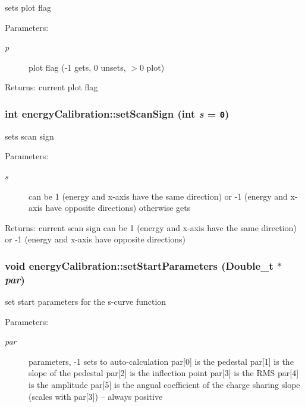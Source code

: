 sets plot flag \begin{Desc}
\item[Parameters:]
\begin{description}
\item[{\em p}]plot flag (-1 gets, 0 unsets, $>$0 plot) \end{description}
\end{Desc}
\begin{Desc}
\item[Returns:]current plot flag \end{Desc}
\subsubsection{\setlength{\rightskip}{0pt plus 5cm}int energy\-Calibration::set\-Scan\-Sign (int {\em s} = {\tt 0})\hspace{0.3cm}{\tt  [inline]}}\label{classenergyCalibration_7dbf1676b30ffe90c5aa917f1b2b77ee}


sets scan sign \begin{Desc}
\item[Parameters:]
\begin{description}
\item[{\em s}]can be 1 (energy and x-axis have the same direction) or -1 (energy and x-axis have opposite directions) otherwise gets \end{description}
\end{Desc}
\begin{Desc}
\item[Returns:]current scan sign can be 1 (energy and x-axis have the same direction) or -1 (energy and x-axis have opposite directions) \end{Desc}
\subsubsection{\setlength{\rightskip}{0pt plus 5cm}void energy\-Calibration::set\-Start\-Parameters (Double\_\-t $\ast$ {\em par})}\label{classenergyCalibration_ba156f5290f7b404d7b8ea735fd7e7bf}


set start parameters for the s-curve function \begin{Desc}
\item[Parameters:]
\begin{description}
\item[{\em par}]parameters, -1 sets to auto-calculation par[0] is the pedestal par[1] is the slope of the pedestal par[2] is the inflection point par[3] is the RMS par[4] is the amplitude par[5] is the angual coefficient of the charge sharing slope (scales with par[3]) -- always positive \end{description}
\end{Desc}


